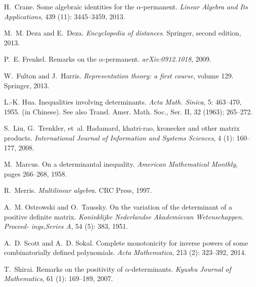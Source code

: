 \documentclass[11pt]{article}
\begin{document}
\begin{thebibliography}{33}
H.~Crane.
\newblock Some algebraic identities for the $\alpha$-permanent.
\newblock \emph{Linear Algebra and Its Applications}, 439
  (11): 3445--3459, 2013.

M.~M. Deza and E.~Deza.
\newblock \emph{Encyclopedia of distances}.
\newblock Springer, second edition, 2013.

P.~E. Frenkel.
\newblock Remarks on the $\alpha$-permanent.
\newblock \emph{arXiv:0912.1018}, 2009.

W.~Fulton and J.~Harris.
\newblock \emph{Representation theory: a first course}, volume 129.
\newblock Springer, 2013.

L.-K. Hua.
\newblock Inequalities involving determinants.
\newblock \emph{Acta Math. Sinica}, 5: 463--470, 1955.
\newblock (in Chinese). See also Transl. Amer. Math. Soc., Ser. II, 32 (1963);
  265--272.

S.~Liu, G.~Trenkler, et~al.
\newblock Hadamard, khatri-rao, kronecker and other matrix products.
\newblock \emph{International Journal of Information and Systems Sciences},
  4 (1): 160--177, 2008.

M.~Marcus.
\newblock On a determinantal inequality.
\newblock \emph{American Mathematical Monthly}, pages 266--268, 1958.

R.~Merris.
\newblock \emph{Multilinear algebra}.
\newblock CRC Press, 1997.

A.~M. Ostrowski and O.~Taussky.
\newblock On the variation of the determinant of a positive definite matrix.
\newblock \emph{Koninklijke Nederlandse Akademievan Wetenschappen. Proceed-
  ings,Series A}, 54 (5): 383, 1951.

A.~D. Scott and A.~D. Sokal.
\newblock Complete monotonicity for inverse powers of some combinatorially
  defined polynomials.
\newblock \emph{Acta Mathematica}, 213 (2): 323--392, 2014.

T.~Shirai.
\newblock Remarks on the positivity of $\alpha$-determinants.
\newblock \emph{Kyushu Journal of Mathematics}, 61 (1):
  169--189, 2007.


\end{thebibliography}
\end{document}
